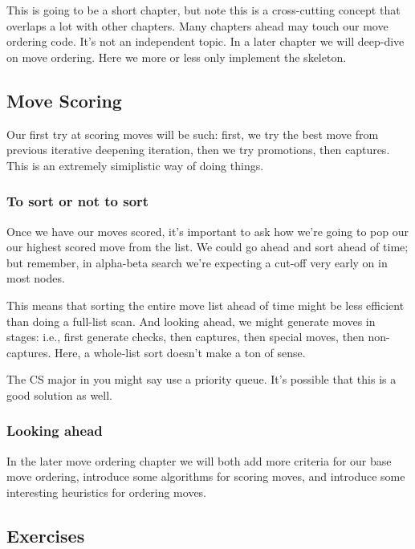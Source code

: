 \documentclass[letterpaper,11pt]{article}
\begin{document}
This is going to be a short chapter, 
but note this is a cross-cutting concept that overlaps a lot with other chapters.
Many chapters ahead may touch our move ordering code. It's not an independent topic.
In a later chapter we will deep-dive on move ordering. Here we more or less only 
implement the skeleton.

\subsection{Move Scoring}
Our first try at scoring moves will be such: first, we try the best move from previous iterative 
deepening iteration, then we try promotions, then captures. This is an extremely simiplistic way of doing 
things.

\subsubsection*{To sort or not to sort}

Once we have our moves scored, it's important to ask how we're going to pop our
our highest scored move from the list. We could go ahead and sort ahead of time;
but remember, in alpha-beta search we're expecting a cut-off very early on in most nodes.

This means that sorting the entire move list ahead of time might be less efficient than 
doing a full-list scan. And looking ahead, we might generate moves in stages: i.e.,
first generate checks, then captures, then special moves, then non-captures. Here, a whole-list 
sort doesn't make a ton of sense.

The CS major in you might say use a priority queue. It's possible that this is a good
solution as well.

\subsubsection*{Looking ahead}

In the later move ordering chapter we will both add more criteria for our base move ordering, 
introduce some algorithms for scoring moves, and introduce some interesting heuristics for 
ordering moves.

\subsection{Exercises}

\subsubsection{}
\end{document}
